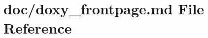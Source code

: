 \hypertarget{doxy__frontpage_8md}{\section{doc/doxy\-\_\-frontpage.md File Reference}
\label{doxy__frontpage_8md}
}
